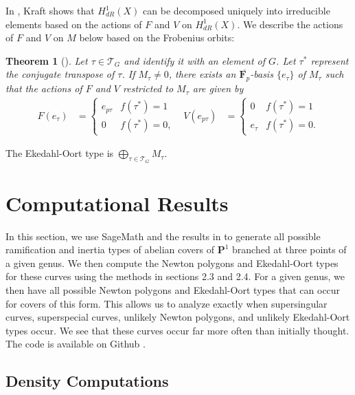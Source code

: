 \documentclass{article}
\newtheorem{theorem}{Theorem}[section]
\theoremstyle{remark}
\theoremstyle{definition}
\begin{document}
\par In \cite{kraft}, Kraft shows that $H^1_{dR}(X)$ can be decomposed uniquely into irreducible elements based on the actions of $F$ and $V$ on $H^1_{dR}(X)$. We describe the actions of $F$ and $V$ on $M$ below based on the Frobenius orbits:
\begin{theorem}[]
\label{eo}
    Let $\tau \in \mathcal{T}_G$ and identify it with an element of $G$. Let $\tau^\ast$ represent the conjugate transpose of $\tau$.  If $M_\tau \neq 0$, there exists an $\overline{\mathbf{F}_p}$-basis $\{e_{\tau} \}$ of $M_\tau$ such that the actions of $F$ and $V$ restricted to $M_\tau$ are given by
    \begin{align*}F(e_{\tau}) &= \begin{cases}
        e_{p\tau} & f(\tau^\ast) = 1 \\ 0 & f(\tau^\ast) = 0,
    \end{cases} & V(e_{p\tau}) &= \begin{cases}
        0 & f(\tau^\ast) = 1 \\
        e_{\tau} & f(\tau^\ast) = 0.
    \end{cases} \end{align*}
\end{theorem}
\par The Ekedahl-Oort type is $\bigoplus_{\tau \in \mathcal{T}_G} M_\tau$.
\section{Computational Results}
\par \hspace{\parindent} In this section, we use SageMath and the results in \cite[Section 2.1]{booher_supersingular_2025} to generate all possible ramification and inertia types of abelian covers of $\mathbf{P}^1$ branched at three points of a given genus. We then compute the Newton polygons and Ekedahl-Oort types for these curves using the methods in sections 2.3 and 2.4. For a given genus, we then have all possible Newton polygons and Ekedahl-Oort types that can occur for covers of this form. This allows us to analyze exactly when supersingular curves, superspecial curves, unlikely Newton polygons, and unlikely Ekedahl-Oort types occur. We see that these curves occur far more often than initially thought. The code is available on Github \cite{ds}.


\subsection{Density Computations}
\end{document}
